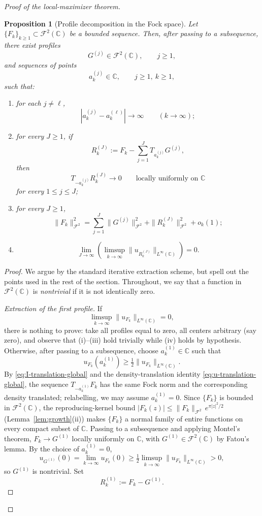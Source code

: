 \documentclass[a4paper,11pt,reqno]{amsart}
\numberwithin{equation}{section}
\theoremstyle{plain} %
\newtheorem{proposition}{Proposition}[section]
\theoremstyle{definition} %
\theoremstyle{remark}
\newcommand{\C}{\mathbb{C}}
\begin{document}
\begin{proof}[Proof of the local-maximizer theorem]
\begin{proposition}[Profile decomposition in the Fock space]\label{prop:profile-global}
Let \(\{F_k\}_{k\ge 1}\subset \mathcal F^2(\C)\) be a bounded sequence. Then,
after passing to a subsequence, there exist profiles
\[
G^{(j)}\in \mathcal F^2(\C),
\qquad j\ge 1,
\]
and sequences of points
\[
a_k^{(j)}\in \C,
\qquad j\ge 1,\ k\ge 1,
\]
such that:
\begin{enumerate}
    \item[(i)] for each \(j\neq \ell\),
    \[
    |a_k^{(j)}-a_k^{(\ell)}|\to \infty
    \qquad (k\to \infty);
    \]
    \item[(ii)] for every \(J\ge 1\), if
    \[
    R_k^{(J)}
    :=
    F_k-\sum_{j=1}^J T_{a_k^{(j)}}G^{(j)},
    \]
    then
    \[
    T_{-a_k^{(j)}}R_k^{(J)}\to 0
    \qquad\text{locally uniformly on }\C
    \]
    for every \(1\le j\le J\);
    \item[(iii)] for every \(J\ge 1\),
    \[
    \|F_k\|_{\mathcal F^2}^2
    =
    \sum_{j=1}^J \|G^{(j)}\|_{\mathcal F^2}^2
    +\|R_k^{(J)}\|_{\mathcal F^2}^2
    +o_k(1);
    \]
    \item[(iv)]
    \[
    \lim_{J\to\infty}\left(\limsup_{k\to\infty}
    \|u_{R_k^{(J)}}\|_{L^\infty(\C)}\right)=0.
    \]
\end{enumerate}
\end{proposition}

\begin{proof}
We argue by the standard iterative extraction scheme, but spell out the points
used in the rest of the section. Throughout, we say that a function in
\(\mathcal F^2(\C)\) is \emph{nontrivial} if it is not identically zero.

\medskip
\noindent\emph{Extraction of the first profile.}
If
\[
\limsup_{k\to\infty}\|u_{F_k}\|_{L^\infty(\C)}=0,
\]
there is nothing to prove: take all profiles equal to zero, all centers
arbitrary (say zero), and observe that (i)--(iii) hold trivially while (iv)
holds by hypothesis. Otherwise, after passing to a subsequence, choose
\(a_k^{(1)}\in \C\) such that
\[
u_{F_k}(a_k^{(1)})\ge \tfrac12\|u_{F_k}\|_{L^\infty(\C)}.
\]
By \eqref{eq:I-translation-global} and the density-translation identity
\eqref{eq:u-translation-global}, the sequence \(T_{-a_k^{(1)}}F_k\) has the
same Fock norm and the corresponding density translated; relabelling, we may
assume \(a_k^{(1)}=0\). Since \(\{F_k\}\) is bounded in \(\mathcal F^2(\C)\),
the reproducing-kernel bound \(|F_k(z)|\le \|F_k\|_{\mathcal F^2}\,
e^{\pi |z|^2/2}\) (Lemma~\ref{lem:growth}(ii)) makes \(\{F_k\}\) a normal
family of entire functions on every compact subset of \(\C\). Passing to a
subsequence and applying Montel's theorem, \(F_k\to G^{(1)}\) locally
uniformly on \(\C\), with \(G^{(1)}\in\mathcal F^2(\C)\) by Fatou's lemma. By
the choice of \(a_k^{(1)}=0\),
\[
u_{G^{(1)}}(0)=\lim_{k\to\infty}u_{F_k}(0)
\ge \tfrac12 \limsup_{k\to\infty}\|u_{F_k}\|_{L^\infty(\C)}>0,
\]
so \(G^{(1)}\) is nontrivial. Set
\[
R_k^{(1)}:=F_k-G^{(1)}.
\]


\end{proof}
\end{proof}
\end{document}
